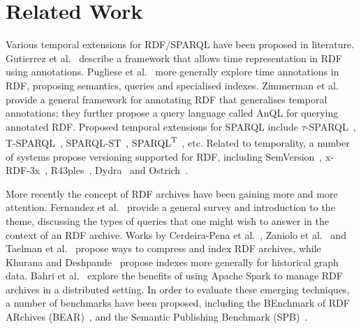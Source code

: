 \documentclass{llncs}
\begin{document}
\section{Related Work}

Various temporal extensions for RDF/SPARQL have been proposed in literature. Gutierrez et al.~\cite{GutierrezHV07} describe a framework that allows time representation in RDF using annotations. Pugliese et al.~\cite{PuglieseUS08} more generally explore time annotations in RDF, proposing semantics, queries and specialised indexes. Zimmerman et al.~\cite{ZimmermannLPS12} provide a general framework for annotating RDF that generalises temporal annotations; they further propose a query language called AnQL for querying annotated RDF. Proposed temporal extensions for SPARQL include $\tau$-SPARQL~\cite{TappoletB09}, T-SPARQL~\cite{Grandi10}, SPARQL-ST~\cite{PerryJS11}, SPARQL\textsuperscript{T}~\cite{ZanioloGACG18}, etc. Related to temporality, a number of systems propose versioning supported for RDF, including SemVersion~\cite{VolkelG06}, x-RDF-3x~\cite{NeumannW10}, R43ples~\cite{GraubeHU14}, Dydra~\cite{AndersonB16} and Ostrich~\cite{TaelmanSV18}. 

More recently the concept of RDF archives have been gaining more and more attention. Fernandez et al.~\cite{FernandezPU15} provide a general survey and introduction to the theme, discussing the types of queries that one might wish to answer in the context of an RDF archive. Works by Cerdeira{-}Pena et al.~\cite{Cerdeira-PenaFF16}, Zaniolo et al.~\cite{ZanioloGACG18} and Taelman et al.~\cite{TaelmanSHMV19} propose ways to compress and index RDF archives, while Khurana and Deshpande~\cite{KhuranaD16} propose indexes more generally for historical graph data. Bahri et al.~\cite{BahriLA18} explore the benefits of using Apache Spark to manage RDF archives in a distributed setting. In order to evaluate these emerging techniques, a number of benchmarks have been proposed, including the BEnchmark of RDF
ARchives (BEAR)~\cite{FernandezUPK19}, and the Semantic Publishing Benchmark (SPB)~\cite{Papakonstantinou18}.
\end{document}
